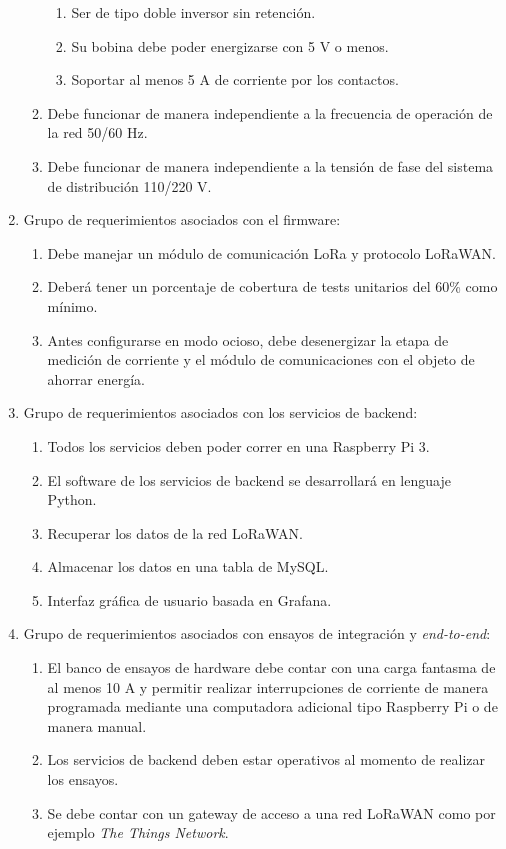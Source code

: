 \begin{enumerate}
\begin{enumerate}
\begin{enumerate}
			\item Ser de tipo doble inversor sin retención.
			\item Su bobina debe poder energizarse con 5 V o menos.
			\item Soportar al menos 5 A de corriente por los contactos.
		\end{enumerate} 
		\item Debe funcionar de manera independiente a la frecuencia de operación de la red 50/60 Hz.
		\item Debe funcionar de manera independiente a la tensión de fase del sistema de distribución 110/220 V.
	\end{enumerate}
	\item Grupo de requerimientos asociados con el firmware:
	\begin{enumerate}
		\item Debe manejar un módulo de comunicación LoRa y protocolo LoRaWAN.
		\item Deberá tener un porcentaje de cobertura de tests unitarios del 60\% como mínimo.
		\item Antes configurarse en modo ocioso, debe desenergizar la etapa de medición de corriente y el módulo de comunicaciones con el objeto de ahorrar energía.
	\end{enumerate}
	
	\item Grupo de requerimientos asociados con los servicios de backend:
	\label{requerimientos_backend}
	\begin{enumerate}
		\item Todos los servicios deben poder correr en una Raspberry Pi 3.
		\item El software de los servicios de backend se desarrollará en lenguaje Python.
		\item Recuperar los datos de la red LoRaWAN.\label{requerimiento_LORAWAN}
		\item Almacenar los datos en una tabla de MySQL.
		\item Interfaz gr\'{a}fica de usuario basada en Grafana.
	\end{enumerate}
	
	\item Grupo de requerimientos asociados con ensayos de integración y \textit{end-to-end}:
	\begin{enumerate}
		\item El banco de ensayos de hardware debe contar con una carga fantasma de al menos 10 A y permitir realizar interrupciones de corriente de manera programada mediante una computadora adicional tipo Raspberry Pi o de manera manual.
		\item Los servicios de backend deben estar operativos al momento de realizar los ensayos.
		\item Se debe contar con un gateway de acceso a una red LoRaWAN como por ejemplo \textit{The Things Network}.
	\end{enumerate}
\end{enumerate}


